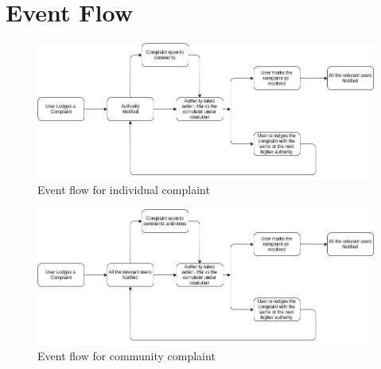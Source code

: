 \documentclass{article}
\begin{document}
\section{Event Flow}
        \begin{figure}[h]
            \centering
            \includegraphics[width=1.0\textwidth,height=0.5\textwidth]{Individual_Complaint}
            \caption{Event flow for individual complaint}
            \label{fig:my_label}
        \end{figure}
        \begin{figure}[h]
            \centering
            \includegraphics[width=1.0\textwidth,height=0.5\textwidth]{Community_Complaint}
            \caption{Event flow for community complaint}
            \label{fig:my_label}
        \end{figure}
        \clearpage
\end{document}

